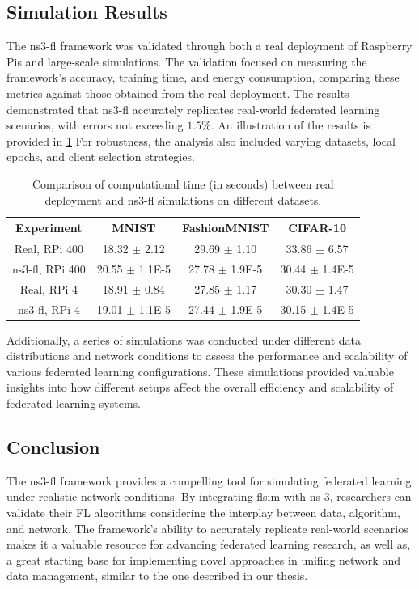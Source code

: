 \subsection{Simulation Results}
The ns3-fl framework was validated through both a real deployment of Raspberry Pis and large-scale simulations.
The validation focused on measuring the framework's accuracy, training time, and energy consumption, comparing these
metrics against those obtained from the real deployment. The results demonstrated that ns3-fl accurately replicates
real-world federated learning scenarios, with errors not exceeding $1.5\%$. An illustration of the results is provided
in \cref{tab:ns3-fl_results}
For robustness, the analysis also included varying datasets, local epochs, and client selection strategies.

\begin{table}[H]
    \centering
    \begin{tabular}{|c|c|c|c|}
        \hline
        \rowcolor{lightgray}
        \textbf{Experiment} & \textbf{MNIST}     & \textbf{FashionMNIST} & \textbf{CIFAR-10}  \\
        \hline
        Real, RPi 400       & 18.32 $\pm$ 2.12   & 29.69 $\pm$ 1.10      & 33.86 $\pm$ 6.57   \\
        ns3-fl, RPi 400     & 20.55 $\pm$ 1.1E-5 & 27.78 $\pm$ 1.9E-5    & 30.44 $\pm$ 1.4E-5 \\
        \hline
        Real, RPi 4         & 18.91 $\pm$ 0.84   & 27.85 $\pm$ 1.17      & 30.30 $\pm$ 1.47   \\
        ns3-fl, RPi 4       & 19.01 $\pm$ 1.1E-5 & 27.44 $\pm$ 1.9E-5    & 30.15 $\pm$ 1.4E-5 \\
        \hline
    \end{tabular}
    \caption{Comparison of computational time (in seconds) between real deployment and ns3-fl simulations on different datasets.}
    \label{tab:ns3-fl_results}
\end{table}

Additionally, a series of simulations was conducted under different data distributions and network conditions to assess the
performance and scalability of various federated learning configurations. These simulations provided valuable insights into
how different setups affect the overall efficiency and scalability of federated learning systems.

\subsection{Conclusion}
The ns3-fl framework provides a compelling tool for simulating federated learning under realistic network conditions.
By integrating flsim with ns-3, researchers can validate their FL algorithms considering the interplay between data,
algorithm, and network. The framework's ability to accurately replicate real-world scenarios makes it a valuable resource
for advancing federated learning research, as well as, a great starting base for implementing novel approaches in unifing
network and data management, similar to the one described in our thesis.
